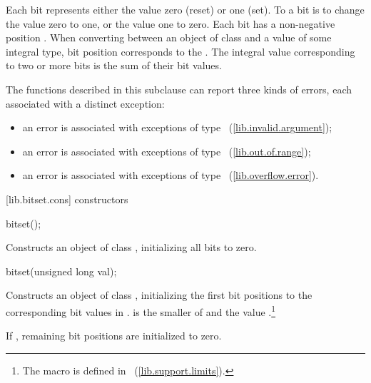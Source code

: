 \pnum
Each bit represents either the value zero (reset) or one (set).
To
a bit is to change the value zero to one, or the value one to
zero.
Each bit has a non-negative position .
When converting
between an object of class
and a value of some
integral type, bit position  corresponds to the
.
The integral value corresponding to two
or more bits is the sum of their bit values.

\pnum
The functions described in this subclause can report three kinds of
errors, each associated with a distinct exception:

\begin{itemize}
\item
an
error is associated with exceptions of type
~(\ref{lib.invalid.argument});
%
\item
an
error is associated with exceptions of type
~(\ref{lib.out.of.range});
%
\item
an
error is associated with exceptions of type
~(\ref{lib.overflow.error}).
%
\end{itemize}

[lib.bitset.cons]{ constructors}

%
\begin{itemdecl}
bitset();
\end{itemdecl}

\begin{itemdescr}
\pnum
\effects
Constructs an object of class
,
initializing all bits to zero.
\end{itemdescr}

\begin{itemdecl}
bitset(unsigned long val);
\end{itemdecl}

\begin{itemdescr}
\pnum
\effects
Constructs an object of class
,
initializing the first  bit positions to the corresponding bit
values in .
 is the smaller of  and the value
.\footnote{The macro
 is defined in ~(\ref{lib.support.limits}).}

If , remaining bit positions are initialized to zero.
\end{itemdescr}

